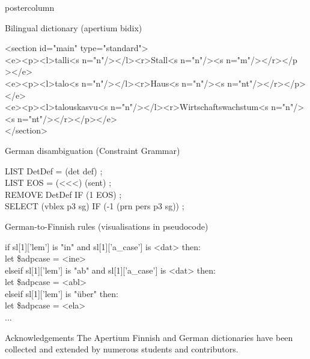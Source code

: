 \documentclass[final,hyperref={pdfpagelabels}]{beamer}
\begin{document}
\begin{frame}
\begin{columns}
\begin{column}{.49\textwidth}
\begin{beamercolorbox}[center,wd=\textwidth]{postercolumn}
\begin{minipage}[T]{.95\textwidth}
{            \begin{block}{Bilingual dictionary (apertium bidix)}
            \begin{texttt}
  <section id="main" type="standard"> \\
    <e><p><l>talli<s n="n"/></l><r>Stall<s n="n"/><s n="m"/></r></p \\
></e> \\
    <e><p><l>talo<s n="n"/></l><r>Haus<s n="n"/><s n="nt"/></r></p></e> \\
    <e><p><l>talouskasvu<s n="n"/></l><r>Wirtschaftswachstum<s n="n"/><s n="nt"/></r></p></e> \\
    </section> \\
            \end{texttt}
            \end{block}

            \begin{block}{German disambiguation (Constraint Grammar)}
            \begin{texttt}
LIST DetDef = (det def) ; \\
LIST EOS = (<<<) (sent) ; \\
REMOVE DetDef IF (1 EOS) ; \\
SELECT (vblex p3 sg) IF (-1 (prn pers p3 sg)) ; \\
            \end{texttt}
            \end{block}
            \begin{block}{German-to-Finnish rules (visualisations in pseudocode)}
            \begin{texttt}
if sl[1]['lem'] is "in" and sl[1]['a\_case'] is <dat> then: \\
  let \$adpcase = <ine> \\
elseif sl[1]['lem'] is "ab" and sl[1]['a\_case'] is <dat> then: \\
  let \$adpcase = <abl> \\
elseif sl[1]['lem'] is "über" then: \\
  let \$adpcase = <ela> \\
...
            \end{texttt}

            \end{block}

        \begin{block}{Acknowledgements}
        The Apertium Finnish and German dictionaries have been collected and
            extended by numerous students and contributors.
      \end{block}
         }
        \end{minipage}
      \end{beamercolorbox}
    \end{column}
  \end{columns}

  \end{frame}
\end{document}
